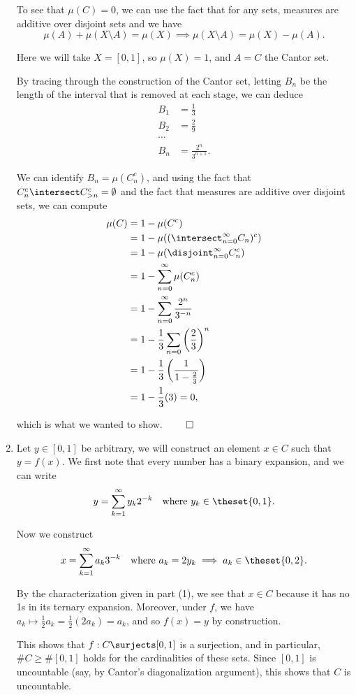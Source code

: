 \begin{solution}
\begin{enumerate}
    To see that $\mu(C) = 0$, we can use the fact that for any sets, measures are additive over disjoint sets and we have
    $$
    \mu(A) + \mu(X \setminus A) = \mu(X) \implies \mu(X \setminus A) = \mu(X) - \mu(A).
    $$

    Here we will take $X = [0,1]$, so $\mu(X) = 1$, and $A = C$ the Cantor set.

    By tracing through the construction of the Cantor set, letting $B_n$ be the length of the interval that is removed at each stage, we can deduce
    \[
    \begin{align*}
      B_1 &= \frac 1 3 \\
      B_2 &= \frac 2 9 \\
      \cdots \\
      B_n &= \frac {2^n}{3^{n+1}}
    .\end{align*}
    \]

    We can identify $B_n = \mu(C_n^c)$, and using the fact that $C_n^c \intersect C_{>n}^c = \emptyset$ and the fact that measures are additive over disjoint sets, we can compute
    \[
    \begin{align*}
      \mu(C) &= 1 - \mu(C^c) \\
             &= 1 - \mu((\intersect_{n=0}^\infty C_n)^c) \\
             &= 1 - \mu(\disjoint_{n=0}^\infty C_n^c) \\
             &= 1 - \sum_{n=0}^\infty \mu(C_n^c) \\
             &= 1 - \sum_{n=0}^\infty \frac{2^n}{3^{-n}} \\
             &= 1 - \frac 1 3 \sum_{n=0} \left( \frac 2 3 \right)^n \\
             &= 1 - \frac 1 3 \left( \frac 1 {1-\frac 2 3} \right) \\
             &= 1 - \frac 1 3 (3)  = 0,
    \end{align*}
    \]

    which is what we wanted to show. $\qed$

  \item Let $y\in [0,1]$ be arbitrary, we will construct an element $x\in C$ such that $y = f(x)$. We first note that every number has a binary expansion, and we can write
    $$
    y = \sum_{k=1}^\infty y_k 2^{-k} \quad\text{where } y_k \in \theset{0, 1}.
    $$

    Now we construct
    $$
    x = \sum_{k=1}^\infty a_k 3^{-k}\quad\text{where } a_k = 2y_k \implies a_k \in \theset{0, 2}.
    $$

    By the characterization given in part (1), we see that $x\in C$ because it has no 1s in its ternary expansion. Moreover, under $f$, we have $a_k \mapsto \frac 1 2 a_k = \frac 1 2 (2 a_k) = a_k$, and so $f(x) = y$ by construction.

    This shows that $f: C \surjects [0,1]$ is a surjection, and in particular, $\# C \geq \#[0, 1]$ holds for the cardinalities of these sets. Since $[0,1]$ is uncountable (say, by Cantor's diagonalization argument), this shows that $C$ is uncountable.
  \end{enumerate}
\end{solution}

